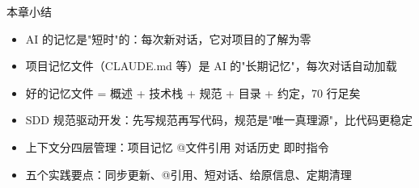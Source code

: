 \begin{tcbsummary}{本章小结}
\begin{itemize}
  \item AI 的记忆是"短时"的：每次新对话，它对项目的了解为零
  \item 项目记忆文件（CLAUDE.md 等）是 AI 的"长期记忆"，每次对话自动加载
  \item 好的记忆文件 = 概述 + 技术栈 + 规范 + 目录 + 约定，70 行足矣
  \item SDD 规范驱动开发：先写规范再写代码，规范是"唯一真理源"，比代码更稳定
  \item 上下文分四层管理：项目记忆 @文件引用 对话历史 即时指令
  \item 五个实践要点：同步更新、@引用、短对话、给原信息、定期清理
\end{itemize}

\end{tcbsummary}

